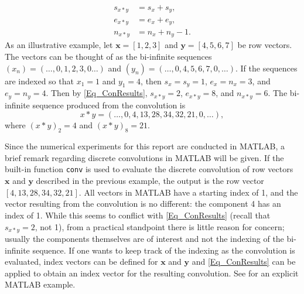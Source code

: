 \documentclass[12pt]{article}
\begin{document}
\begin{align}
s_{x*y} &= s_x + s_y, \nonumber \\
e_{x*y} &= e_x + e_y, \label{Eq_ConResults} \\
n_{x*y} &= n_x + n_y - 1. \nonumber
\end{align}
As an illustrative example, let $\mathbf{x} = [1,2,3]$ and $\mathbf{y} = [4,5,6,7]$ be row vectors. The vectors can be thought of as the bi-infinite sequences $(x_n) = (\ldots,0,1,2,3,0\ldots)$ and $(y_n) = (\ldots,0,4,5,6,7,0,\ldots)$. If the sequences are indexed so that $x_1 = 1$ and $y_1 = 4$, then $s_x = s_y = 1$, $e_x = n_x = 3$, and $e_y = n_y = 4$. Then by \eqref{Eq_ConResults}, $s_{x*y} = 2$, $e_{x*y} = 8$, and $n_{x*y} = 6$. The bi-infinite sequence produced from the convolution is
\[x*y = (\ldots,0,4,13,28,34,32,21,0,\ldots),\]
where $(x*y)_2 = 4$ and $(x*y)_8 = 21$. \par 
Since the numerical experiments for this report are conducted in MATLAB, a brief remark regarding discrete convolutions in MATLAB will be given. If the built-in function \texttt{conv} is used to evaluate the discrete convolution of row vectors $\mathbf{x}$ and $\mathbf{y}$ described in the previous example, the output is the row vector $[4,13,28,34,32,21]$.  All vectors in MATLAB have a starting index of 1, and the vector resulting from the convolution is no different: the component 4 has an index of 1. While this seems to conflict with \eqref{Eq_ConResults} (recall that $s_{x*y} = 2$, not 1), from a practical standpoint there is little reason for concern; usually the components themselves are of interest and not the indexing of the bi-infinite sequence. If one wants to keep track of the indexing as the convolution is evaluated, index vectors can be defined for $\mathbf{x}$ and $\mathbf{y}$ and \eqref{Eq_ConResults} can be applied to obtain an index vector for the resulting convolution. See \cite{BoggessAlbert2001Afci} for an explicit MATLAB example. \par 
\end{document}

